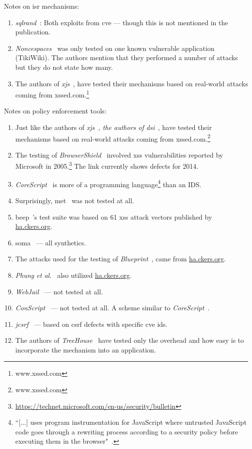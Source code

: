 \documentclass[conference]{IEEEtran}
\begin{document}
Notes on {\sc isr} mechanisms:
\begin{enumerate}
\item {\it {\sc sql}rand}~\cite{BK04}: Both exploits from {\sc cve} --- though
this is not mentioned in the publication.
\item {\it Noncespaces}~\cite{GC09} was only tested on one
known vulnerable application (TikiWiki). The authors mention that they performed
a number of attacks but they do not state how many.
\item The authors of {\it x{\sc js}}~\cite{APKLM10}, have tested
their mechanisms based on real-world attacks coming from
{\sc xss}ed.com.\footnote{www.xssed.com}
\end{enumerate}

Notes on policy enforcement tools:
\begin{enumerate}
\item Just like the authors of {\it x{\sc js}~\cite{APKLM10},
the authors of {\sc dsi}}~\cite{NSS06}, have tested
their mechanisms based on real-world attacks coming from
{\sc xss}ed.com.\footnote{www.xssed.com}
\item The testing of {\it BrowserShield}~\cite{RDWDE07}
involved {\sc xss} vulnerabilities reported by Microsoft
in 2005.\footnote{\url{https://technet.microsoft.com/en-us/security/bulletin}}
The link currently shows defects for 2014.
\item {\it CoreScript}~\cite{YCIS07} is more of a programming
language\footnote{``[...] uses program instrumentation for
JavaScript where untrusted JavaScript
code goes through a rewriting process according to a security policy
before executing them in the browser"~\cite{PSC09}.}
than an {\sc IDS}.
\item Surprisingly, {\sc met}~\cite{ELX07} was not tested at all.
\item {\sc beep}~\cite{TNH07}'s test suite was based on 61 {\sc xss}
attack vectors published by \url{ha.ckers.org}.
\item {\sc soma}~\cite{OWVS08} --- all synthetics.
\item The attacks used for the testing of {\it Blueprint}~\cite{LV09},
came from \url{ha.ckers.org}.
\item {\it Phung et al.}~\cite{PSC09} also utilized \url{ha.ckers.org}.
\item {\it WebJail}~\cite{VDDPJ11} --- not tested at all.
\item {\it ConScript}~\cite{ML10} --- not tested at all. A scheme
similar to {\it CoreScript}~\cite{YCIS07}.
\item {\it j{\sc csrf}}~\cite{PS11} --- based on {\sc csrf}
defects with specific {\sc cve id}s.
\item The authors of {\it TreeHouse}~\cite{IW12} have tested
only the overhead and how easy is to incorporate the mechanism
into an application.
\end{enumerate}
\end{document}
